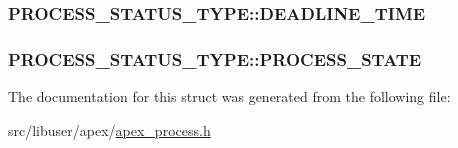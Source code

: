 \subsubsection[{\texorpdfstring{D\+E\+A\+D\+L\+I\+N\+E\+\_\+\+T\+I\+ME}{DEADLINE_TIME}}]{ P\+R\+O\+C\+E\+S\+S\+\_\+\+S\+T\+A\+T\+U\+S\+\_\+\+T\+Y\+P\+E\+::\+D\+E\+A\+D\+L\+I\+N\+E\+\_\+\+T\+I\+ME}\hypertarget{structPROCESS__STATUS__TYPE_a6d80b5fda37441bd85be66724c8e39ea}{}\label{structPROCESS__STATUS__TYPE_a6d80b5fda37441bd85be66724c8e39ea}
\subsubsection[{\texorpdfstring{P\+R\+O\+C\+E\+S\+S\+\_\+\+S\+T\+A\+TE}{PROCESS_STATE}}]{ P\+R\+O\+C\+E\+S\+S\+\_\+\+S\+T\+A\+T\+U\+S\+\_\+\+T\+Y\+P\+E\+::\+P\+R\+O\+C\+E\+S\+S\+\_\+\+S\+T\+A\+TE}\hypertarget{structPROCESS__STATUS__TYPE_a31a78e79d64f384b6f628c5441e6df90}{}\label{structPROCESS__STATUS__TYPE_a31a78e79d64f384b6f628c5441e6df90}


The documentation for this struct was generated from the following file\+:\begin{DoxyCompactItemize}
\item 
src/libuser/apex/\hyperlink{apex__process_8h}{apex\+\_\+process.\+h}\end{DoxyCompactItemize}
